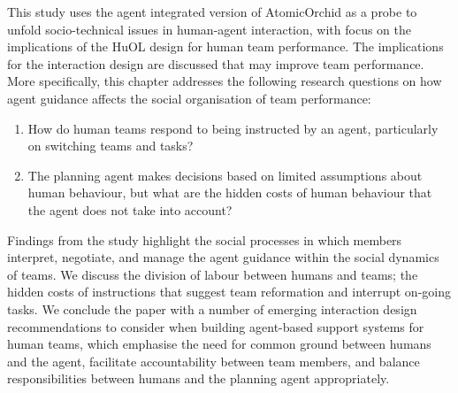 
This study uses the agent integrated version of AtomicOrchid as a probe to unfold socio-technical issues in human-agent interaction, with focus on the implications of the HuOL design for human team performance. The implications for the interaction design are discussed that may improve team performance. More specifically, this chapter addresses the following research questions on how agent guidance affects the social organisation of team performance:\\

\begin{enumerate}
\item How do human teams respond to being instructed by an agent, particularly on switching teams and tasks?\\
\item The planning agent makes decisions based on limited assumptions about human behaviour, but what are the hidden costs of human behaviour that the agent does not take into account?\\
\end{enumerate}

Findings from the study highlight the social processes in which members interpret, negotiate, and manage the agent guidance within the social dynamics of teams. We discuss the division of labour between humans and teams; the hidden costs of instructions that suggest team reformation and interrupt on-going tasks. We conclude the paper with a number of emerging interaction design recommendations to consider when building agent-based support systems for human teams, which emphasise the need for common ground between humans and the agent, facilitate accountability between team members, and balance responsibilities between humans and the planning agent appropriately.\\



